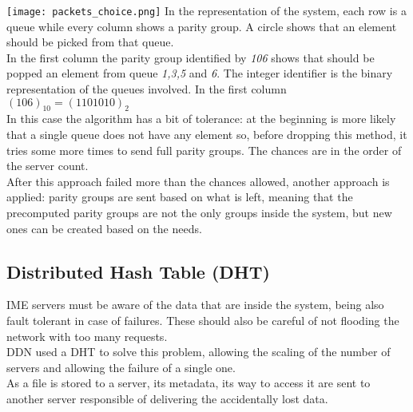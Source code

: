 \texttt{[image: packets\_choice.png]}
In the representation of the system, each row is a queue while every column shows a parity group.
A circle shows that an element should be picked from that queue. \\
In the first column the parity group identified by \textit{106} shows that
should be popped an element from queue \textit{1,3,5} and \textit{6}. The
integer identifier is the binary representation of the queues involved. In the
first column $(106)_{10} = (1101010)_2$ \\
In this case the algorithm has a bit of tolerance: at the beginning is more
likely that a single queue does not have any element so, before dropping this
method, it tries some more times to send full parity groups. The chances are in
the order of the server count. \\
After this approach failed more than the chances allowed, another approach is applied:
parity groups are sent based on what is left, meaning that the precomputed
parity groups are not the only groups inside the system, but new ones can be
created based on the needs.\\


\subsection{Distributed Hash Table (DHT)}
IME servers must be aware of the data that are inside the system, being also
fault tolerant in case of failures. These should also be careful of not flooding
the network with too many requests. \\
DDN used a DHT to solve this problem, allowing the scaling of the number of
servers and allowing the failure of a single one. \\
As a file is stored to a server, its metadata, its way to access it are sent to
another server responsible of delivering the accidentally lost data.

